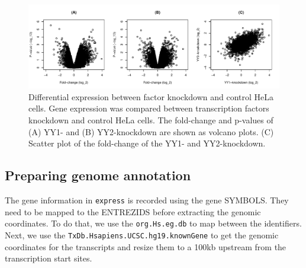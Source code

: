 \documentclass[9pt,a4paper,]{extarticle}
\newenvironment{Shaded}{\begin{snugshade}}{\end{snugshade}}
\newcommand{\CommentTok}[1]{\textcolor[rgb]{0.56,0.35,0.01}{\textit{#1}}}
\newcommand{\DataTypeTok}[1]{\textcolor[rgb]{0.13,0.29,0.53}{#1}}
\newcommand{\DecValTok}[1]{\textcolor[rgb]{0.00,0.00,0.81}{#1}}
\newcommand{\KeywordTok}[1]{\textcolor[rgb]{0.13,0.29,0.53}{\textbf{#1}}}
\newcommand{\NormalTok}[1]{#1}
\newcommand{\OperatorTok}[1]{\textcolor[rgb]{0.81,0.36,0.00}{\textbf{#1}}}
\newcommand{\StringTok}[1]{\textcolor[rgb]{0.31,0.60,0.02}{#1}}
\begin{document}
\begin{figure}

{\centering \includegraphics[width=1\linewidth]{targetFlow_files/figure-latex/foldchange-1} 

}

\caption{Differential expression between factor knockdown and control HeLa cells. Gene expression was compared between transcription factors knockdown and control HeLa cells. The fold-change and p-values of (A) YY1- and (B) YY2-knockdown are shown as volcano plots. (C) Scatter plot of the fold-change of the YY1- and YY2-knockdown.}\label{fig:foldchange}
\end{figure}

\hypertarget{preparing-genome-annotation}{%
\subsection{Preparing genome annotation}\label{preparing-genome-annotation}}

The gene information in \texttt{express} is recorded using the gene SYMBOLS. They need to be mapped to the ENTREZIDS before extracting the genomic coordinates. To do that, we use the \texttt{org.Hs.eg.db} to map between the identifiers. Next, we use the \texttt{TxDb.Hsapiens.UCSC.hg19.knownGene} to get the genomic coordinates for the transcripts and resize them to a 100kb upstream from the transcription start sites.

\begin{Shaded}
\end{Shaded}
\end{document}
